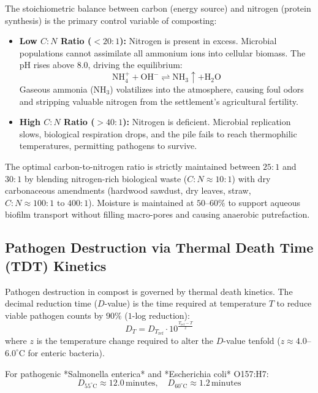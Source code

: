 The stoichiometric balance between carbon (energy source) and nitrogen (protein synthesis) is the primary control variable of composting:
\begin{itemize}
    \item \textbf{Low $C:N$ Ratio ($<20:1$):} Nitrogen is present in excess. Microbial populations cannot assimilate all ammonium ions into cellular biomass. The pH rises above $8.0$, driving the equilibrium:
    \begin{equation}
    \mathrm{NH}_4^+ + \mathrm{OH}^- \rightleftharpoons \mathrm{NH}_3 \uparrow + \mathrm{H}_2\mathrm{O}
    \label{eq:ammonia_equilibrium}
    \end{equation}
    Gaseous ammonia ($\mathrm{NH}_3$) volatilizes into the atmosphere, causing foul odors and stripping valuable nitrogen from the settlement's agricultural fertility.
    \item \textbf{High $C:N$ Ratio ($>40:1$):} Nitrogen is deficient. Microbial replication slows, biological respiration drops, and the pile fails to reach thermophilic temperatures, permitting pathogens to survive.
\end{itemize}

The optimal carbon-to-nitrogen ratio is strictly maintained between $25:1$ and $30:1$ by blending nitrogen-rich biological waste ($C:N \approx 10:1$) with dry carbonaceous amendments (hardwood sawdust, dry leaves, straw, $C:N \approx 100:1\text{ to }400:1$). Moisture is maintained at $50$--$60\%$ to support aqueous biofilm transport without filling macro-pores and causing anaerobic putrefaction.

\subsection{Pathogen Destruction via Thermal Death Time (TDT) Kinetics}

Pathogen destruction in compost is governed by thermal death kinetics. The decimal reduction time ($D$-value) is the time required at temperature $T$ to reduce viable pathogen counts by $90\%$ ($1$-log reduction):
\begin{equation}
D_T = D_{T_{\mathrm{ref}}} \cdot 10^{\frac{T_{\mathrm{ref}} - T}{z}}
\label{eq:decimal_reduction}
\end{equation}
where $z$ is the temperature change required to alter the $D$-value tenfold ($z \approx 4.0$--$6.0^\circ\mathrm{C}$ for enteric bacteria).

For pathogenic *Salmonella enterica* and *Escherichia coli* O157:H7:
\begin{equation}
D_{55^\circ\mathrm{C}} \approx 12.0\,\mathrm{minutes}, \quad D_{60^\circ\mathrm{C}} \approx 1.2\,\mathrm{minutes}
\label{eq:pathogen_dvalues}
\end{equation}

